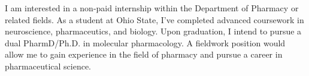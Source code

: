 

\begin{cvparagraph}

I am interested in a non-paid internship within the Department of Pharmacy or related fields. As a student at Ohio State, I've completed advanced coursework in neuroscience, pharmaceutics, and biology.  Upon graduation, I intend to pursue a dual PharmD/Ph.D. in molecular pharmacology. A fieldwork position would allow me to gain experience in the field of pharmacy and pursue a career in pharmaceutical science.
\end{cvparagraph}